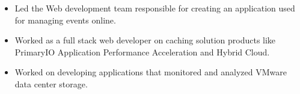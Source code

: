 \documentclass[10pt,a4paper]{altacv}
\begin{document}
\tagline{}

\begin{fullwidth}
\makecvheader
\end{fullwidth}



\begin{itemize}
\item Led the Web development team responsible for creating an application used for managing events online.
\end{itemize}

\divider

\begin{itemize}
\item Worked as a full stack web developer on caching solution
products like PrimaryIO Application Performance Acceleration and Hybrid Cloud.
\item Worked on developing applications that monitored and analyzed VMware data center storage. 
\end{itemize}
\end{document}
